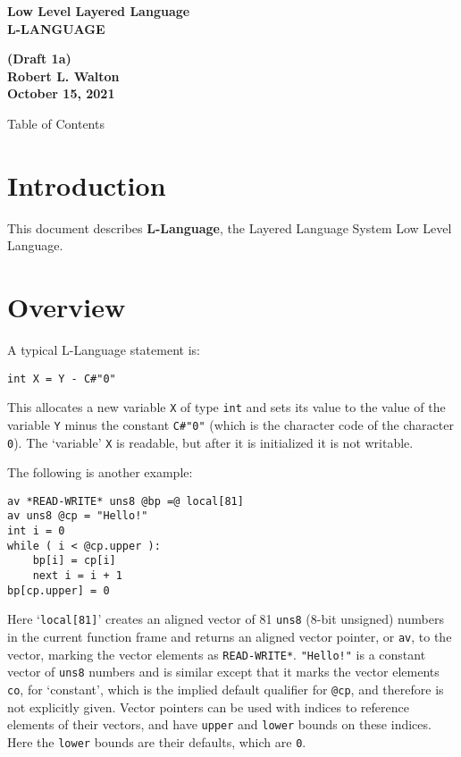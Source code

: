 \documentclass[12pt]{article}
\makeatletter
\renewcommand\tableofcontents{%
    \begin{list}{}%
	     {\setlength{\itemsep}{0in}%
	      \setlength{\topsep}{0in}%
	      \setlength{\parsep}{1ex}%
	      \setlength{\labelwidth}{0in}%
	      \setlength{\baselineskip}{1.5ex}%
	      \setlength{\leftmargin}{0.8in}%
	      \setlength{\rightmargin}{0.8in}}%
    \item\@starttoc{toc}%
    \end{list}}
\newcommand{\key}[1]{{\rm \bfseries #1}}
\newenvironment{indpar}[1][0.3in]%
	{\begin{list}{}%
		     {\setlength{\itemsep}{0in}%
		      \setlength{\topsep}{0in}%
		      \setlength{\parsep}{1ex}%
		      \setlength{\labelwidth}{#1}%
		      \setlength{\leftmargin}{#1}%
		      \addtolength{\leftmargin}{\labelsep}}%
	 \item}%
	{\end{list}}
\makeatother
\begin{document}
        
\begin{center}
\Large \bf
Low Level Layered Language\\[0.5ex]
\huge \bf
L-LANGUAGE
\end{center}
\begin{center}
\large \bf
(Draft 1a)
\\[0.5ex]
Robert L. Walton\\
October 15, 2021

\bigskip
 
Table of Contents
\end{center}

\bigskip

\tableofcontents 

\newpage

\section{Introduction}

This document describes \key{L-Language}, the Layered Language
System Low Level Language.

\section{Overview}

A typical L-Language statement is:
\begin{indpar}\begin{verbatim}
int X = Y - C#"0"
\end{verbatim}\end{indpar}
This allocates a new variable {\tt X} of type {\tt int}
and sets its value to the value of the
variable {\tt Y} minus the constant {\tt C\#"0"} (which is
the character code of the character {\tt 0}).
The `variable' {\tt X} is readable, but after it is
initialized it is not writable.

The following is another example:
\begin{indpar}\begin{verbatim}
av *READ-WRITE* uns8 @bp =@ local[81]
av uns8 @cp = "Hello!"
int i = 0
while ( i < @cp.upper ):
    bp[i] = cp[i]
    next i = i + 1
bp[cp.upper] = 0
\end{verbatim}\end{indpar}

Here `{\tt local[81]}' creates an aligned vector of
81 {\tt uns8} (8-bit unsigned) numbers in the current function
frame and returns an aligned vector pointer, or {\tt av}, to
the vector, marking the vector elements as {\tt *READ-WRITE*}.
{\tt "Hello!"} is a constant vector of {\tt uns8} numbers
and is similar except that it marks the vector elements
{\tt co}, for `constant', which is the implied default qualifier
for {\tt @cp}, and therefore
is not explicitly given.
Vector pointers can be used with indices
to reference elements of their vectors, and have {\tt upper} and
{\tt lower} bounds on these indices.  Here the {\tt lower} bounds
are their defaults, which are {\tt 0}.
\end{document}
